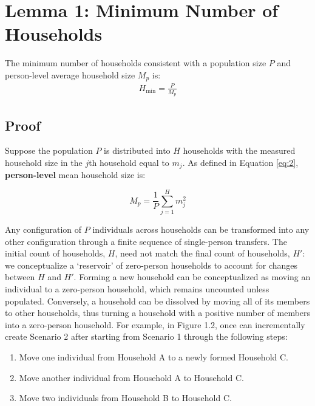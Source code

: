 \documentclass[
]{article}
\providecommand{\tightlist}{%
  \setlength{\itemsep}{0pt}\setlength{\parskip}{0pt}}
\begin{document}
\hypertarget{lemma-1-minimum-number-of-households}{%
\section{Lemma 1: Minimum Number of
Households}\label{lemma-1-minimum-number-of-households}}

The minimum number of households consistent with a population size \(P\)
and person-level average household size \(M_p\) is: \begin{align}
H_{\min} = \frac{P}{M_p}
\end{align}

\hypertarget{proof}{%
\subsection{Proof}\label{proof}}

Suppose the population \(P\) is distributed into \(H\) households with
the measured household size in the \(j\)th household equal to \(m_j\).
As defined in Equation \eqref{eq:2}, \textbf{person-level} mean
household size is:

\begin{equation}
M_p = \frac{1}{P}\sum_{j = 1}^H m_j^2
\end{equation}

Any configuration of \(P\) individuals across households can be
transformed into any other configuration through a finite sequence of
single-person transfers. The initial count of households, \(H\), need
not match the final count of households, \(H'\): we conceptualize a
`reservoir' of zero-person households to account for changes between
\(H\) and \(H'\). Forming a new household can be conceptualized as
moving an individual to a zero-person household, which remains uncounted
unless populated. Conversely, a household can be dissolved by moving all
of its members to other households, thus turning a household with a
positive number of members into a zero-person household. For example, in
Figure 1.2, once can incrementally create Scenario 2 after starting from
Scenario 1 through the following steps:

\begin{enumerate}
\def\labelenumi{\arabic{enumi}.}
\tightlist
\item
  Move one individual from Household A to a newly formed Household C.
\item
  Move another individual from Household A to Household C.
\item
  Move two individuals from Household B to Household C.
\end{enumerate}
\end{document}
